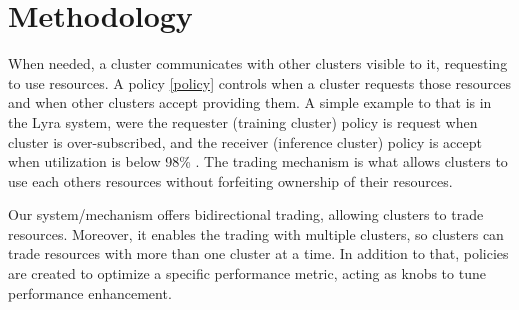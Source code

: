 \section{Methodology}


\vspace{2em}
When needed, a cluster communicates with other clusters visible to it, requesting to use resources. A policy \ref{policy} 
controls when a cluster requests those resources and when other clusters accept providing them. 
A simple example to that is in the Lyra system, were the requester (training cluster) policy is request 
when cluster is over-subscribed, and the receiver (inference cluster) policy is accept when 
utilization is below 98\% \cite{li_lyra_2023}. The trading mechanism is what allows clusters to use each others 
resources without forfeiting ownership of their resources. 

Our system/mechanism offers bidirectional trading, allowing clusters to trade resources. Moreover, it 
enables the trading with multiple clusters, so clusters can trade resources with more than one cluster at a time. 
In addition to that, policies are created to optimize a specific performance metric, acting as knobs to 
tune performance enhancement.

